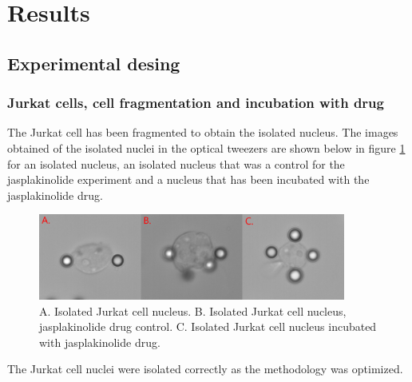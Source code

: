 \documentclass[12pt, a4paper]{article} %
\begin{document}

\section{Results}

\subsection{Experimental desing}

\subsubsection{Jurkat cells, cell fragmentation and incubation with drug}

The Jurkat cell has been fragmented to obtain the isolated nucleus. The images obtained of the isolated nuclei in the optical tweezers are shown below in figure \ref{fig:jurkat_cells} for an isolated nucleus, an isolated nucleus that was a control for the jasplakinolide experiment and a nucleus that has been incubated with the jasplakinolide drug.

\setlength{\parskip}{4mm}

\begin{figure}[htbp]
	\centering
	\includegraphics[width=0.9\textwidth]{figures/jurkat_cell_shape.png}
	\caption{A. Isolated Jurkat cell nucleus. B. Isolated Jurkat cell nucleus, jasplakinolide drug control. C. Isolated Jurkat cell nucleus incubated with jasplakinolide drug.}
	\label{fig:jurkat_cells}
\end{figure}

The Jurkat cell nuclei were isolated correctly as the methodology was optimized.
\end{document}
